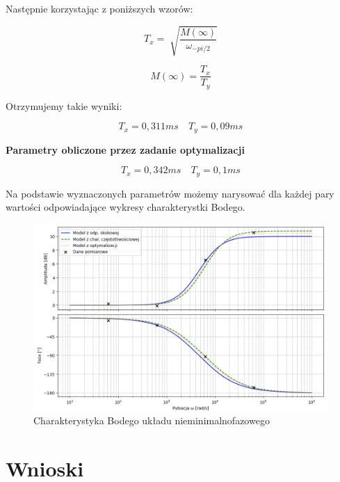 \documentclass[12pt,a4paper]{article}
\begin{document}
	\noindent Następnie korzystając z poniższych wzorów:
	
	\begin{equation}
		T_x = \sqrt[]{\frac{M(\infty)}{\omega_{-pi/2}}}
	\end{equation}
	
	\begin{equation}
		M(\infty) = \frac{T_x}{T_y}
	\end{equation}
	
 	\noindent Otrzymujemy takie wyniki:
	
	\[
	T_x = 0,311ms \quad T_y = 0,09 ms
	\]
	
	\textbf{Parametry obliczone przez zadanie optymalizacji}
	
	\[
	T_x = 0,342ms \quad T_y = 0,1ms
	\]
	
	
	Na podstawie wyznaczonych parametrów możemy narysować dla każdej pary wartości odpowiadające 
	wykresy charakterystki Bodego.
	
	\begin{figure}[H]
		\centering
		\includegraphics[width=1\linewidth]{zdjecia/bode_nmf.png}
		\caption{Charakterystyka Bodego układu nieminimalnofazowego}
		\label{fig:bode_nmf}
	\end{figure}
	
	\section{Wnioski}
\end{document}
